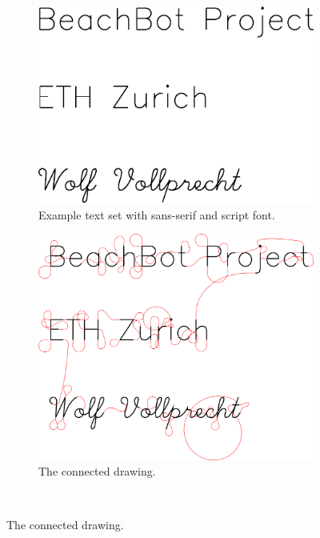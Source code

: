 \begin{figure}[h]
\centering
\begin{subfigure}[t]{0.95\textwidth}
\centering
	\includegraphics[width=\textwidth]{images/results/hershey/hershey_text.pdf}
	\caption{Example text set with sans-serif and script font.}
\end{subfigure}
\par \bigskip
\begin{subfigure}[t]{0.95\textwidth}
\centering
	\includegraphics[width=\textwidth]{images/results/hershey/hershey_connected.pdf}
	\caption{The connected drawing.}
\end{subfigure}\\

\end{figure}

